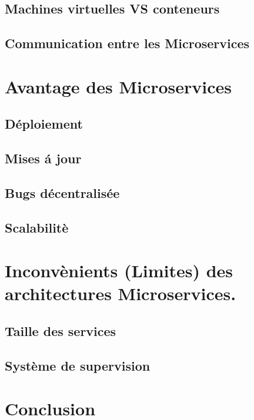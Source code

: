 \documentclass{beamer}
\begin{document}
\subsection*{Machines virtuelles VS conteneurs }
\subsection*{Communication entre les Microservices}

\section{Avantage des Microservices }
\subsection*{D\'eploiement }
\subsection*{Mises \'a jour}
\subsection*{Bugs d\'ecentralis\'ee}
\subsection*{Scalabilit\`e}


\section{Inconv\`enients (Limites) des architectures Microservices.}

\subsection*{Taille des services}
\subsection*{Système de supervision}


\section{Conclusion}
\end{document}
